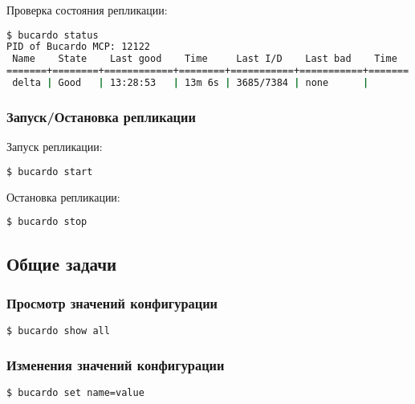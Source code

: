 Проверка состояния репликации:

\begin{lstlisting}[language=Bash,label=lst:bucardo-master-slave2,caption=Проверка состояния репликации]
$ bucardo status
PID of Bucardo MCP: 12122
 Name    State    Last good    Time     Last I/D    Last bad    Time
=======+========+============+========+===========+===========+=======
 delta | Good   | 13:28:53   | 13m 6s | 3685/7384 | none      |
\end{lstlisting}

\subsubsection{Запуск/Остановка репликации}

Запуск репликации:

\begin{lstlisting}[language=Bash,label=lst:bucardo11,caption=Запуск репликации]
$ bucardo start
\end{lstlisting}

Остановка репликации:

\begin{lstlisting}[language=Bash,label=lst:bucardo12,caption=Остановка репликации]
$ bucardo stop
\end{lstlisting}

\subsection{Общие задачи}

\subsubsection{Просмотр значений конфигурации}

\begin{lstlisting}[language=Bash,label=lst:bucardo13,caption=Просмотр значений конфигурации]
$ bucardo show all
\end{lstlisting}

\subsubsection{Изменения значений конфигурации}

\begin{lstlisting}[language=Bash,label=lst:bucardo14,caption=Изменения значений конфигурациии]
$ bucardo set name=value
\end{lstlisting}

